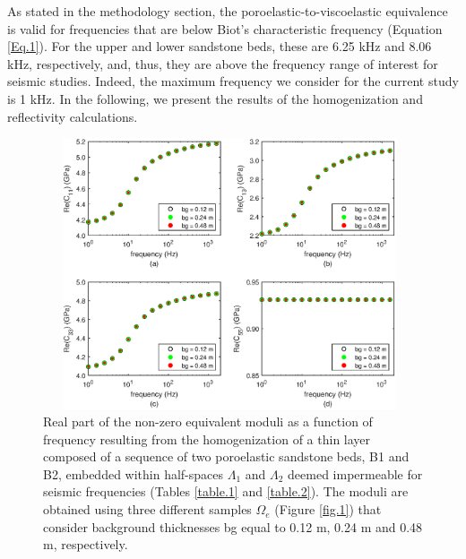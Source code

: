 \documentclass[draft]{agujournal2019}
\begin{document}
As stated in the methodology section, the poroelastic-to-viscoelastic equivalence is valid for frequencies that are below Biot's characteristic frequency (Equation \eqref{Eq.1}). For the upper and lower sandstone beds, these are 6.25 kHz and 8.06 kHz, respectively, and, thus, they are above the frequency range of interest for seismic studies. Indeed, the maximum frequency we consider for the current study is 1 kHz. In the following, we present the results of the homogenization and reflectivity calculations.
\begin{figure}[!ht]
\centering
        \includegraphics[width=110mm, height=80mm]{Figure2.eps}
\caption{Real part of the non-zero equivalent moduli as a function of frequency resulting from the homogenization of a thin layer composed of a sequence of two poroelastic sandstone beds, B1 and B2, embedded within  half-spaces $\Lambda_1$ and $\Lambda_2$ deemed impermeable for seismic frequencies (Tables \ref{table.1} and \ref{table.2}). The moduli are obtained using three different samples $\Omega_e$ (Figure \ref{fig.1}) that consider background thicknesses bg equal to 0.12 m, 0.24 m and 0.48 m, respectively.}
\label{fig.2}
\end{figure}
\end{document}
